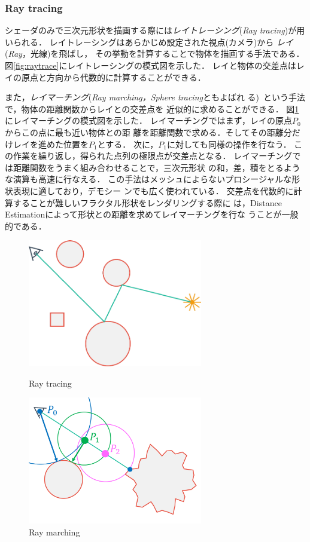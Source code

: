 \subsubsection{Ray tracing}

シェーダのみで三次元形状を描画する際には\emph{レイトレーシング}({\it Ray
tracing})が用いられる．
レイトレーシングはあらかじめ設定された視点(カメラ)から
\emph{レイ}({\it Ray}，光線)を飛ばし，
その挙動を計算することで物体を描画する手法である．
図\ref{fig:raytrace}にレイトレーシングの模式図を示した．
レイと物体の交差点はレイの原点と方向から代数的に計算することができる．

また，\emph{レイマーチング}({\it Ray marching，Sphere tracing}ともよばれ
る)~\cite{hart1996sphere}という手法で，物体の距離関数からレイとの交差点を
近似的に求めることができる．
図\ref{fig:raymarch}にレイマーチングの模式図を示した．
レイマーチングではまず，レイの原点$P_0$からこの点に最も近い物体との距
離を距離関数で求める．そしてその距離分だけレイを進めた位置を$P_1$とする．
次に，$P_1$に対しても同様の操作を行なう．
この作業を繰り返し，得られた点列の極限点が交差点となる．
レイマーチングでは距離関数をうまく組み合わせることで，三次元形状
の和，差，積をとるような演算も高速に行なえる．
この手法はメッシュによらないプロシージャルな形状表現に適しており，デモシー
ンでも広く使われている．
交差点を代数的に計算することが難しいフラクタル形状をレンダリングする際に
は，Distance Estimationによって形状との距離を求めてレイマーチングを行な
うことが一般的である．

 \begin{figure}[htbp]
  \begin{minipage}{0.5\hsize}
   \center
   \includegraphics[width=3in, keepaspectratio]{../img/fractal/raytrace.pdf}
   \caption{Ray tracing}
   \label{fig:raytrace}
  \end{minipage}
  \begin{minipage}{0.5\hsize}
   \center
   \includegraphics[width=3in, keepaspectratio]{../img/fractal/raymarching.pdf}
   \caption{Ray marching}
   \label{fig:raymarch}
  \end{minipage}
 \end{figure}

